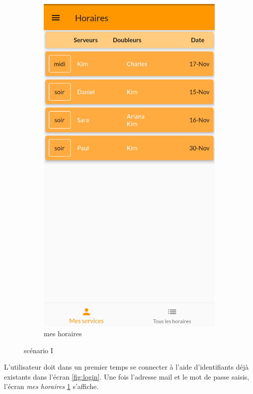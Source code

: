 \begin{figure}[!h]
\begin{subfigure}{.3\textwidth}
        \includegraphics[width=0.9\linewidth]{screenshots/scenario_01/mesHoraires.png}
        \caption{mes horaires}
        \label{fig:mesHoraires}
    \end{subfigure}
    \caption{scénario I}
    \label{fig:scen01}
\end{figure}

L'utilisateur doit dans un premier temps se connecter à l'aide d'identifiants déjà existants dans l'écran \ref{fig:login}. Une fois l'adresse mail et le mot de passe saisis, 
l'écran \textit{mes horaires} \ref{fig:mesHoraires} s'affiche. 


